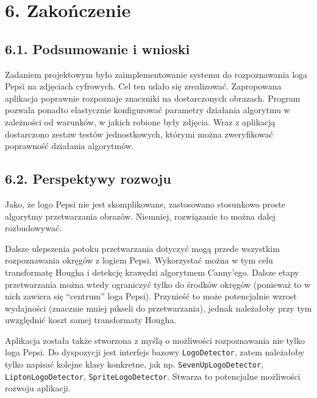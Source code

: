 \documentclass[11pt,a4paper,twoside]{report}
\begin{document}
\section*{6. Zakończenie}

	\subsection*{6.1. Podsumowanie i wnioski}

		Zadaniem projektowym było zaimplementowanie systemu do rozpoznawania loga Pepsi na zdjęciach cyfrowych. Cel ten udało się zrealizować. Zapropowana aplikacja poprawnie rozpoznaje znaczniki na dostarczonych obrazach. Program pozwala ponadto elastycznie konfigurować parametry działania algorytmu w zależności od warunków, w jakich robione były zdjęcia. Wraz z aplikacją dostarczono zestaw testów jednostkowych, którymi można zweryfikować poprawność działania algorytmów.

	\subsection*{6.2. Perspektywy rozwoju}

		Jako, że logo Pepsi nie jest skomplikowane, zastosowano stosunkowo proste algorytmy przetwarzania obrazów. Niemniej, rozwiązanie to można dalej rozbudowywać.

		Dalsze ulepszenia potoku przetwarzania dotyczyć mogą przede wszystkim rozpoznawania okręgów z logiem Pepsi. Wykorzystać można w tym celu transformatę Hougha i detekcję krawędzi algorytmem Canny'ego. Dalsze etapy przetwarzania można wtedy ograniczyć tylko do środków okręgów (ponieważ to w nich zawiera się ``centrum'' loga Pepsi). Przynieść to może potencjalnie wzrost wydajności (znacznie mniej pikseli do przetwarzania), jednak należałoby przy tym uwzględnić koszt samej transformaty Hougha.

		Aplikacja została także stworzona z myślą o możliwości rozpoznawania nie tylko loga Pepsi. Do dyspozycji jest interfejs bazowy \texttt{LogoDetector}, zatem należałoby tylko napisać kolejne klasy konkretne, jak np. \texttt{SevenUpLogoDetector}, \texttt{LiptonLogoDetector}, \texttt{SpriteLogoDetector}. Stwarza to potencjalne możliwości rozwoju aplikacji.
\end{document}
